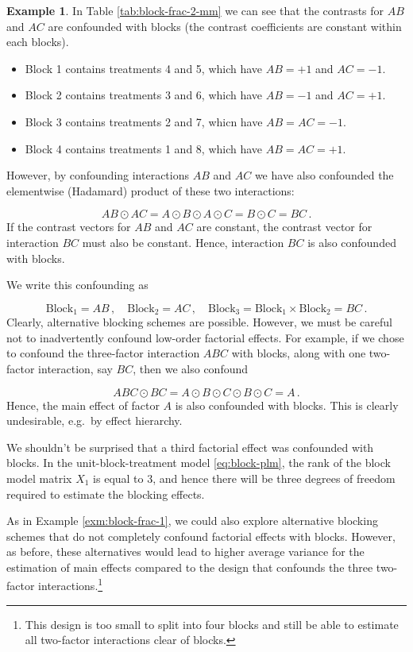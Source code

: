 \documentclass[
]{book}
\theoremstyle{definition}
\theoremstyle{definition}
\newtheorem{example}{Example}[chapter]
\theoremstyle{definition}
\theoremstyle{definition}
\theoremstyle{remark}
\begin{document}
\begin{example}
In Table \ref{tab:block-frac-2-mm} we can see that the contrasts for \(AB\) and \(AC\) are confounded with blocks (the contrast coefficients are constant within each blocks).

\begin{itemize}
\item
  Block 1 contains treatments 4 and 5, which have \(AB = +1\) and \(AC = -1\).
\item
  Block 2 contains treatments 3 and 6, which have \(AB = -1\) and \(AC = +1\).
\item
  Block 3 contains treatments 2 and 7, whicn have \(AB = AC = -1\).
\item
  Block 4 contains treatments 1 and 8, which have \(AB = AC = +1\).
\end{itemize}

However, by confounding interactions \(AB\) and \(AC\) we have also confounded the elementwise (Hadamard) product of these two interactions:

\[
AB \odot AC = A \odot B \odot A \odot C = B \odot C = BC\,.
\]
If the contrast vectors for \(AB\) and \(AC\) are constant, the contrast vector for interaction \(BC\) must also be constant. Hence, interaction \(BC\) is also confounded with blocks.

We write this confounding as

\[
\mathrm{Block}_1 = AB\,,\quad \mathrm{Block}_2 = AC\,,\quad \mathrm{Block}_3 = \mathrm{Block}_1\times\mathrm{Block}_2 = BC\,.
\]
Clearly, alternative blocking schemes are possible. However, we must be careful not to inadvertently confound low-order factorial effects. For example, if we chose to confound the three-factor interaction \(ABC\) with blocks, along with one two-factor interaction, say \(BC\), then we also confound

\[
ABC \odot BC = A \odot B \odot C \odot B \odot C = A\,.
\]
Hence, the main effect of factor \(A\) is also confounded with blocks. This is clearly undesirable, e.g.~by effect hierarchy.

We shouldn't be surprised that a third factorial effect was confounded with blocks. In the unit-block-treatment model \eqref{eq:block-plm}, the rank of the block model matrix \(X_1\) is equal to 3, and hence there will be three degrees of freedom required to estimate the blocking effects.

As in Example \ref{exm:block-frac-1}, we could also explore alternative blocking schemes that do not completely confound factorial effects with blocks. However, as before, these alternatives would lead to higher average variance for the estimation of main effects compared to the design that confounds the three two-factor interactions.\footnote{This design is too small to split into four blocks and still be able to estimate all two-factor interactions clear of blocks.}

\end{example}
\end{document}
